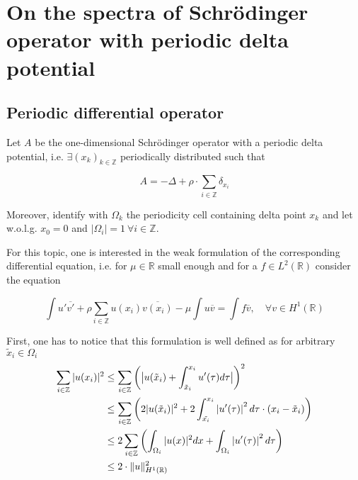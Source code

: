 \documentclass[fontsize=14pt,a4paper,DIV=1]{scrartcl}
\numberwithin{equation}{section}
\newcommand{\R}{\mathbb{R}}
\newcommand{\Z}{\mathbb{Z}}
\begin{document}
\pagestyle{headings}

\section{On the spectra of Schrödinger operator with periodic delta potential}

\subsection{Periodic differential operator}

Let $A$ be the one-dimensional Schrödinger operator with a periodic delta potential, i.e. $\exists (x_{k})_{k \in \Z}$ periodically distributed such that 

\begin{equation}
	A = - \Delta + \rho \cdot \sum_{i \in \Z} \delta_{x_{i}} \label{the-operator}
\end{equation}

Moreover, identify with $\Omega_{k}$ the periodicity cell containing delta point $x_{k}$ and let w.o.l.g. $x_{0} = 0$ and $|\Omega_{i}| = 1 ~\forall i \in \Z$. 


 For this topic, one is interested in the weak formulation of the corresponding differential equation, i.e. for $\mu \in \R$ small enough and for a $f \in L^{2}(\R)$ consider the equation

\begin{equation}
	\int u' \overline{v'} + \rho \sum_{i \in \Z} u(x_{i}) \overline{v(x_{i})} - \mu \int u \overline{v} = \int f \overline{v}, \quad \forall v \in H^{1}(\R) \label{weak-formulation}
\end{equation} 

First, one has to notice that this formulation is well defined as for arbitrary $\tilde{x}_{i} \in \Omega_{i}$
\begin{align}
	\sum_{i \in \Z} |u(x_{i})|^{2} & \leq \sum_{i \in \Z} \left( \big| u(\tilde{x}_{i}) + \int_{\tilde{x}_{i}}^{x_{i}} u'( \tau ) d\tau \big| \right)^{2} \notag \\
		 & \leq \sum_{i \in \Z}  \left( 2 |u(\tilde{x}_{i})|^{2} + 2 \int_{\tilde{x_{i}}}^{x_{i}} \left| u'(\tau) \right|^{2} d\tau \cdot (x_{i} - \tilde{x}_{i}) \right) \notag \\
		 & \leq 2 \sum_{i \in \Z} \left( \int_{\Omega_{i}} |u( x )|^{2} dx +  \int_{\Omega_{i}} \left| u'(\tau) \right|^{2} d\tau \right) \notag \\
		 & \leq 2 \cdot \| u \|^{2}_{H^{1}(\R)} \label{eq:potentialestim}
\end{align}
\end{document}
